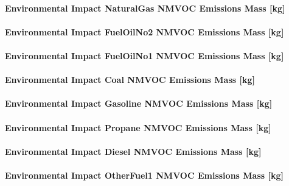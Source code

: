 \paragraph{Environmental Impact NaturalGas NMVOC Emissions Mass {[}kg{]}}\label{environmental-impact-natural-gas-nmvoc-emissions-mass-kg}

\paragraph{Environmental Impact FuelOilNo2 NMVOC Emissions Mass {[}kg{]}}\label{environmental-impact-fuel-oil-2-nmvoc-emissions-mass-kg}

\paragraph{Environmental Impact FuelOilNo1 NMVOC Emissions Mass {[}kg{]}}\label{environmental-impact-fuel-oil-1-nmvoc-emissions-mass-kg}

\paragraph{Environmental Impact Coal NMVOC Emissions Mass {[}kg{]}}\label{environmental-impact-coal-nmvoc-emissions-mass-kg}

\paragraph{Environmental Impact Gasoline NMVOC Emissions Mass {[}kg{]}}\label{environmental-impact-gasoline-nmvoc-emissions-mass-kg}

\paragraph{Environmental Impact Propane NMVOC Emissions Mass {[}kg{]}}\label{environmental-impact-propane-nmvoc-emissions-mass-kg}

\paragraph{Environmental Impact Diesel NMVOC Emissions Mass {[}kg{]}}\label{environmental-impact-diesel-nmvoc-emissions-mass-kg}

\paragraph{Environmental Impact OtherFuel1 NMVOC Emissions Mass {[}kg{]}}\label{environmental-impact-otherfuel1-nmvoc-emissions-mass-kg}

